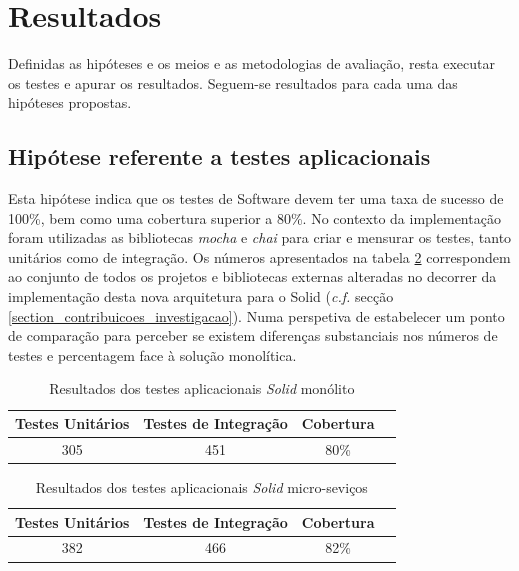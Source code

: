 \section{Resultados}
Definidas as hipóteses e os meios e as metodologias de avaliação, resta executar os testes e apurar os resultados. Seguem-se resultados para cada uma das hipóteses propostas.

\subsection{Hipótese referente a testes aplicacionais}
Esta hipótese indica que os testes de Software devem ter uma taxa de sucesso de 100\%, bem como uma cobertura superior a 80\%.
No contexto da implementação foram utilizadas as bibliotecas \emph{mocha} e \emph{chai} para criar e mensurar os testes, tanto unitários como de integração.
Os números apresentados na tabela \ref{table_testes_aplicacionais_micro_services} correspondem ao conjunto de todos os projetos e bibliotecas externas alteradas no decorrer da implementação desta nova arquitetura para o Solid (\emph{c.f.} secção \ref{section_contribuicoes_investigacao}).
Numa perspetiva de estabelecer um ponto de comparação para perceber se existem diferenças substanciais nos números de testes e percentagem face à solução monolítica.

\begin{table}[h]
\centering
\caption{Resultados dos testes aplicacionais \emph{Solid} monólito}
\vspace{0.5cm}
\label{table_testes_aplicacionais_monolito}
\begin{tabular}{c|c|c|c} 
Testes Unitários & Testes de Integração & Cobertura \\
\hline                          
305 & 451 & 80\% \\
\end{tabular}
\end{table}

\begin{table}[h]
\centering
\caption{Resultados dos testes aplicacionais \emph{Solid} micro-seviços}
\vspace{0.5cm}
\label{table_testes_aplicacionais_micro_services}
\begin{tabular}{c|c|c|c} 
Testes Unitários & Testes de Integração & Cobertura \\
\hline                          
382 & 466 & 82\% \\
\end{tabular}
\end{table}


